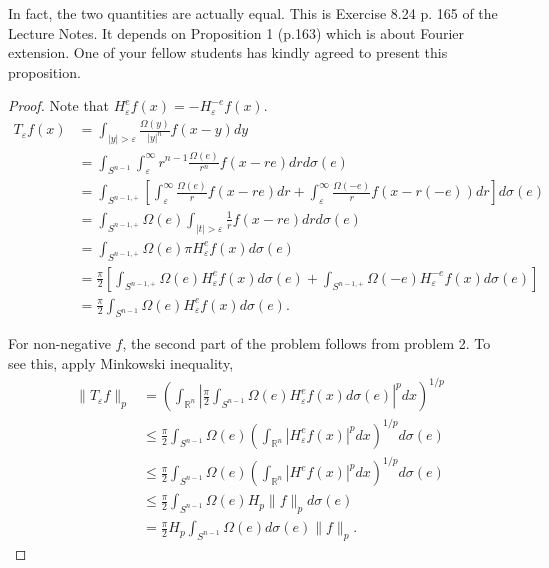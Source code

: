 \begin{enumerate}
In fact, the two quantities are actually equal. This is Exercise 8.24 p. 165 of the Lecture Notes. It depends on Proposition 1 (p.163) which is about Fourier extension. One of your fellow students has kindly agreed to present this proposition.
\begin{proof}
	Note that $H^e_\varepsilon f(x) = - H^{- e}_\varepsilon f(x)$.
	\begin{align*}
		T_\varepsilon f(x)
		&= \int_{|y| > \varepsilon} \frac{\Omega(y)}{|y|^n} f(x - y) d y \\
		&= \int _{S^{n - 1}} \int _\varepsilon^\infty  r^{n - 1} \frac{\Omega(e)}{r^{n}} f(x - r e) d r d \sigma(e) \\
		&= \int _{S^{n - 1, +}} \left[\int _\varepsilon^\infty  \frac{\Omega(e)}{r} f(x - r e) d r + \int _\varepsilon^\infty  \frac{\Omega(-e)}{r} f(x - r (-e)) d r\right] d \sigma(e) \\
		&= \int _{S^{n - 1, +}} \Omega(e) \int _{|t| > \varepsilon}  \frac{1}{r} f(x - r e) d r  d \sigma(e) \\
		&= \int _{S^{n - 1, +}} \Omega(e) \pi H_\varepsilon^e f(x)  d \sigma(e) \\
		&= \frac{\pi}{2} \left[\int _{S^{n - 1, +}} \Omega(e) H_\varepsilon^e f(x)  d \sigma(e)  + \int _{S^{n - 1, +}} \Omega(-e) H_\varepsilon^{-e} f(x)  d \sigma(e)\right]\\
		&= \frac{\pi}{2} \int _{S^{n - 1}} \Omega(e) H_\varepsilon^e f(x)  d \sigma(e) 
	.\end{align*}

	For non-negative $f$, the second part of the problem follows from problem 2. To see this, apply Minkowski inequality,
	\begin{align*}
		\|T_\varepsilon f\|_p
		&= \left(\int _{\mathbb{R}^n} \left| \frac{\pi}{2} \int_{S^{n-1}} \Omega(e) H_{\varepsilon}^e f(x) d \sigma(e) \right|^p dx\right)^{1 / p} \\
		&\leq \frac{\pi}{2}\int_{S^{n-1}} \Omega(e) \left(\int _{\mathbb{R}^n}|H_{\varepsilon}^e f(x)|^p dx\right)^{1 / p} d \sigma(e)  \\
		&\leq \frac{\pi}{2}\int_{S^{n-1}} \Omega(e) \left(\int _{\mathbb{R}^n}|H^e f(x)|^p dx\right)^{1 / p} d \sigma(e)  \\
		&\leq \frac{\pi}{2}\int_{S^{n-1}} \Omega(e) H_p \|f\|_p d \sigma(e)  \\
		&= \frac{\pi}{2}H_p\int_{S^{n-1}} \Omega(e)  d \sigma(e)\|f\|_p 
	.\end{align*}

\end{proof}


\end{enumerate}
